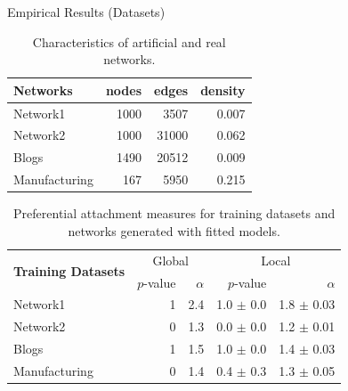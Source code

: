 \begin{frame}[c]{Empirical Results (Datasets)}

    \vspace{-0.2cm}
\begin{table}[h] 
	\centering
	\caption{Characteristics of artificial and real networks.}
    \begin{tabular}{lrrr}
        \hline
        \textbf{Networks} &   nodes &   edges &   density \\
        \hline
        Network1 &    1000 &    3507 &     0.007 \\
        Network2 &    1000 &   31000 &     0.062 \\
        Blogs         &    1490 &   20512 &     0.009 \\
        Manufacturing &     167 &    5950 &     0.215 \\
    \hline
    \end{tabular}
	\label{table:networks_measures}
\end{table}

\begin{table}[t]
\caption{Preferential attachment measures for training datasets and networks generated with fitted models.}
\centering
\begin{tabular}{lrrrr}
  \multirow{2}{*}{\textbf{Training Datasets}}  &
  \multicolumn{2}{c}{Global} & \multicolumn{2}{c}{Local}\\
  \cmidrule(r){2-3} \cmidrule(l){4-5}
  &   $p$-value &   $\alpha$   & $p$-value & $\alpha$   \\
\hline
Network1       & 1 & 2.4 &   1.0 $\pm$ 0.0  &  1.8 $\pm$ 0.03  \\
Network2       & 0 & 1.3 &   0.0 $\pm$ 0.0  &  1.2 $\pm$ 0.01 \\
Blogs          & 1 & 1.5 &   1.0 $\pm$ 0.0  &  1.4 $\pm$ 0.03\\
Manufacturing  & 0 & 1.4 &   0.4 $\pm$ 0.3  &  1.3 $\pm$ 0.05 \\
\hline
\end{tabular}
\label{table:me_gofit}
\end{table}

\end{frame}


